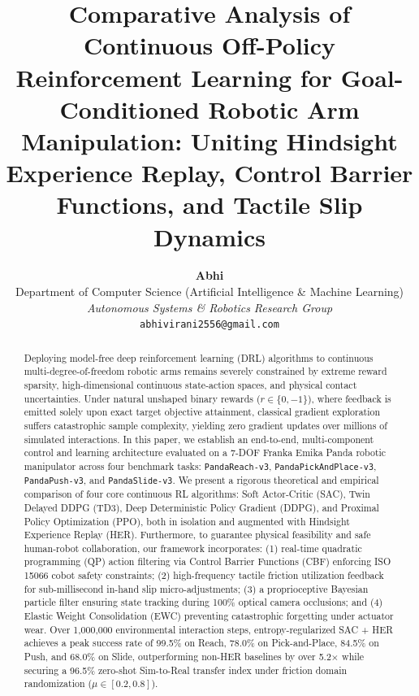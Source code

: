 \documentclass[10pt,twocolumn,a4paper]{article}
\begin{document}
\title{\textbf{\Large Comparative Analysis of Continuous Off-Policy Reinforcement Learning for Goal-Conditioned Robotic Arm Manipulation: Uniting Hindsight Experience Replay, Control Barrier Functions, and Tactile Slip Dynamics}}

\author{
  \textbf{Abhi}\\
  Department of Computer Science (Artificial Intelligence \& Machine Learning)\\
  \textit{Autonomous Systems \& Robotics Research Group}\\
  \texttt{abhivirani2556@gmail.com}
}

\date{}
\maketitle

\begin{abstract}
Deploying model-free deep reinforcement learning (DRL) algorithms to continuous multi-degree-of-freedom robotic arms remains severely constrained by extreme reward sparsity, high-dimensional continuous state-action spaces, and physical contact uncertainties. Under natural unshaped binary rewards ($r \in \{0, -1\}$), where feedback is emitted solely upon exact target objective attainment, classical gradient exploration suffers catastrophic sample complexity, yielding zero gradient updates over millions of simulated interactions. In this paper, we establish an end-to-end, multi-component control and learning architecture evaluated on a 7-DOF Franka Emika Panda robotic manipulator across four benchmark tasks: \texttt{PandaReach-v3}, \texttt{PandaPickAndPlace-v3}, \texttt{PandaPush-v3}, and \texttt{PandaSlide-v3}. We present a rigorous theoretical and empirical comparison of four core continuous RL algorithms: Soft Actor-Critic (SAC), Twin Delayed DDPG (TD3), Deep Deterministic Policy Gradient (DDPG), and Proximal Policy Optimization (PPO), both in isolation and augmented with Hindsight Experience Replay (HER). Furthermore, to guarantee physical feasibility and safe human-robot collaboration, our framework incorporates: (1) real-time quadratic programming (QP) action filtering via Control Barrier Functions (CBF) enforcing ISO 15066 cobot safety constraints; (2) high-frequency tactile friction utilization feedback for sub-millisecond in-hand slip micro-adjustments; (3) a proprioceptive Bayesian particle filter ensuring state tracking during 100\% optical camera occlusions; and (4) Elastic Weight Consolidation (EWC) preventing catastrophic forgetting under actuator wear. Over 1,000,000 environmental interaction steps, entropy-regularized SAC + HER achieves a peak success rate of 99.5\% on Reach, 78.0\% on Pick-and-Place, 84.5\% on Push, and 68.0\% on Slide, outperforming non-HER baselines by over 5.2$\times$ while securing a 96.5\% zero-shot Sim-to-Real transfer index under friction domain randomization ($\mu \in [0.2, 0.8]$).
\end{abstract}
\end{document}
